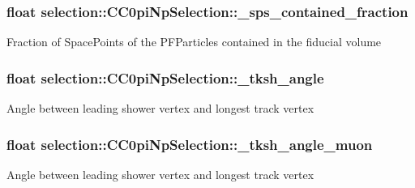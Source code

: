 \subsubsection[{\texorpdfstring{\+\_\+sps\+\_\+contained\+\_\+fraction}{_sps_contained_fraction}}]{\setlength{\rightskip}{0pt plus 5cm}float selection\+::\+C\+C0pi\+Np\+Selection\+::\+\_\+sps\+\_\+contained\+\_\+fraction\hspace{0.3cm}{\ttfamily [private]}}\hypertarget{classselection_1_1CC0piNpSelection_ac425fa284847d7cae95f21367ed4889e}{}\label{classselection_1_1CC0piNpSelection_ac425fa284847d7cae95f21367ed4889e}
Fraction of Space\+Points of the P\+F\+Particles contained in the fiducial volume 
\subsubsection[{\texorpdfstring{\+\_\+tksh\+\_\+angle}{_tksh_angle}}]{\setlength{\rightskip}{0pt plus 5cm}float selection\+::\+C\+C0pi\+Np\+Selection\+::\+\_\+tksh\+\_\+angle\hspace{0.3cm}{\ttfamily [private]}}\hypertarget{classselection_1_1CC0piNpSelection_a959adc6093ff4d2730dac8f75dd1245c}{}\label{classselection_1_1CC0piNpSelection_a959adc6093ff4d2730dac8f75dd1245c}
Angle between leading shower vertex and longest track vertex 
\subsubsection[{\texorpdfstring{\+\_\+tksh\+\_\+angle\+\_\+muon}{_tksh_angle_muon}}]{\setlength{\rightskip}{0pt plus 5cm}float selection\+::\+C\+C0pi\+Np\+Selection\+::\+\_\+tksh\+\_\+angle\+\_\+muon\hspace{0.3cm}{\ttfamily [private]}}\hypertarget{classselection_1_1CC0piNpSelection_a8210028b7144d3dc078201257a1a8663}{}\label{classselection_1_1CC0piNpSelection_a8210028b7144d3dc078201257a1a8663}
Angle between leading shower vertex and longest track vertex 
